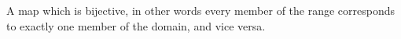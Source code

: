 A map which is bijective, in other words every member of the range
corresponds to exactly one member of the domain, and vice versa.